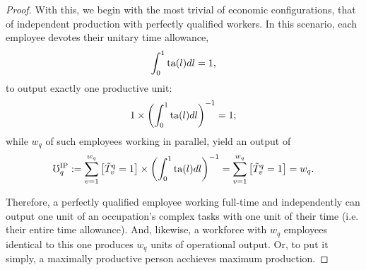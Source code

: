 \documentclass[hidelinks, nonatbib]{elsarticle}
\begin{document}
\begin{lemma}
\begin{proof}
        With this, we begin with the most trivial of economic configurations, that of independent production with perfectly qualified workers. In this scenario, each employee devotes their unitary time allowance,
        \begin{gather}
            \int_{0}^{1}{
                \text{ta}(l)
                dl
            }
            =
            1
            ,
        \end{gather}
        to output exactly one productive unit:
        \begin{gather}
            1
            \times
            \left(
                \int_{0}^{1}{
                    \text{ta}(l)dl
                }
            \right) ^ {-1}
            =
            1
            ;
        \end{gather}
        while $w_q$ of such employees working in parallel, yield an output of
        \begin{gather}
            \mho_{q}^{\text{IP}}
            :=
            \sum_{v=1}^{w_q}{
                \left[
                    \tilde{T}_{v}^{q}
                    =
                    1
                \right]
                \times
                \left(
                    \int_{0}^{1}{
                        \text{ta}(l)
                        dl
                    }
                \right) ^ {-1}
            }
            =
            \sum_{v=1}^{w_q}{
                \left[
                    \tilde{T}_{v}^{q}
                    =
                    1
                \right]
            }
            =
            w_q
            .
        \end{gather}

        Therefore, a perfectly qualified employee working full-time and independently can output one unit of an occupation's complex tasks with one unit of their time (i.e. their entire time allowance). And, likewise, a workforce with $w_q$ employees identical to this one produces $w_q$ units of operational output. Or, to put it simply, a maximally productive person acchieves maximum production.
        

\end{proof}
\end{lemma}
\end{document}
